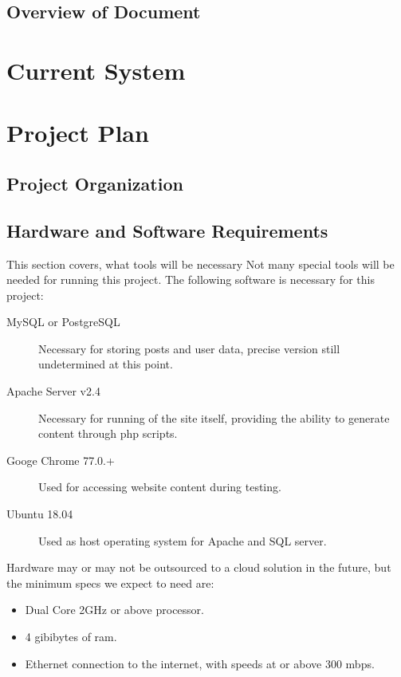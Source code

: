 \documentclass[letter,12pt]{report}
\begin{document}
\section{Overview of Document}




\chapter{Current System}

\chapter{Project Plan}

\section{Project Organization}

\section{Hardware and Software Requirements}

This section covers, what tools will be necessary
Not many special tools will be needed for running this project.
The following software is necessary for this project:
\begin{description}
\item [MySQL or PostgreSQL] Necessary for storing posts and user data,
precise version still undetermined at this point.
\item [Apache Server v2.4] Necessary for running of the site itself,
providing the ability to generate content through php scripts.
\item [Googe Chrome 77.0.+] Used for accessing website content during testing.
\item [Ubuntu 18.04] Used as host operating system for Apache and SQL server.
\end{description}

Hardware may or may not be outsourced to a cloud solution in the future,
but the minimum specs we expect to need are:

\begin{itemize}
\item Dual Core 2GHz or above processor.
\item 4 gibibytes of ram.
\item Ethernet connection to the internet, with speeds at or above 300 mbps.
\end{itemize}
\end{document}
